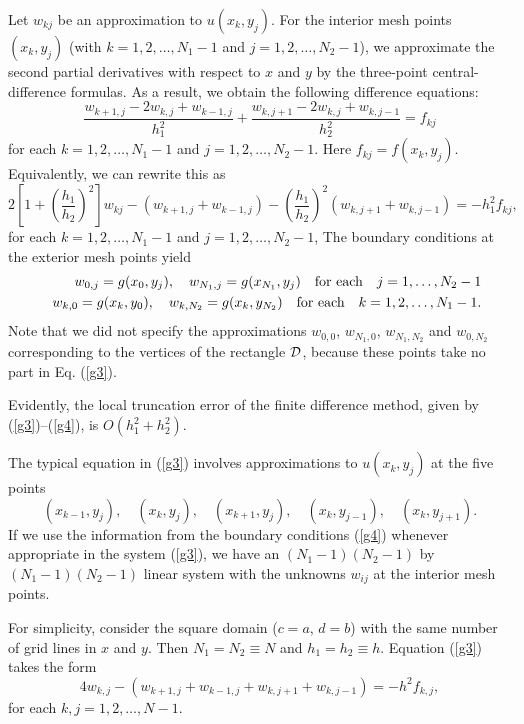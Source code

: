 Let $w_{kj}$ be an approximation to $u(x_{k}, y_{j})$.
For the interior mesh points $(x_{k}, y_{j})$ (with
$k=1,2,\dots,N_{1}-1$ and $j=1,2,\dots,N_{2}-1$), we approximate
the second partial derivatives with respect to $x$ and $y$
by the three-point central-difference formulas. As a result, we obtain the following
difference equations:
\[
\frac{w_{k+1,j}-2w_{k,j}+w_{k-1,j}}{h_{1}^{2}}+
\frac{w_{k,j+1}-2w_{k,j}+w_{k,j-1}}{h_{2}^{2}}=f_{kj}
\]
for each $k=1,2,\dots,N_{1}-1$ and $j=1,2,\dots,N_{2}-1$.
Here $f_{kj}=f(x_{k}, y_{j})$. Equivalently, we can rewrite
this as
\begin{equation}
2\left[1+\left(\frac{h_{1}}{h_{2}}\right)^{2}\right]w_{kj}-\left(w_{k+1,j}+w_{k-1,j}\right)
-\left(\frac{h_{1}}{h_{2}}\right)^{2}\left(w_{k,j+1}+w_{k,j-1}\right)
=-h_{1}^{2}f_{kj}, \label{g3}
\end{equation}
for each $k=1,2,\dots,N_{1}-1$ and $j=1,2,\dots,N_{2}-1$,
The boundary conditions at the
exterior mesh points yield
\begin{eqnarray}
&&w_{0,j}=g(x_{0}, y_{j}), \quad w_{N_{1},j}=g(x_{N_{1}}, y_{j})
\quad \hbox{for each} \quad j=1,\dots,N_{2}-1 \label{g4} \\
&&w_{k,0}=g(x_{k}, y_{0}), \quad w_{k,N_{2}}=g(x_{k}, y_{N_{2}})
\quad \hbox{for each} \quad k=1,2,\dots,N_{1}-1.\nonumber  
\end{eqnarray}
Note that we did not specify the approximations $w_{0,0}$,
$w_{N_{1},0}$, $w_{N_{1},N_{2}}$ and $w_{0,N_{2}}$ corresponding to
the vertices of the rectangle ${\cal D}$, because these points take
no part in Eq. (\ref{g3}).

 
Evidently, the local truncation
error of the finite difference method, given by (\ref{g3})--(\ref{g4}), is $O(h_{1}^{2}+h_{2}^{2})$.

 
The typical equation in (\ref{g3}) involves approximations to $u(x_{k}, y_{j})$ at the five
points
\[
(x_{k-1}, y_{j}), \quad (x_{k}, y_{j}), \quad (x_{k+1}, y_{j}), \quad
(x_{k}, y_{j-1}), \quad (x_{k}, y_{j+1}).
\]
If we use the information from the boundary conditions (\ref{g4})
whenever appropriate in the system (\ref{g3}), we have an
$(N_{1}-1)(N_{2}-1)$ by $(N_{1}-1)(N_{2}-1)$ linear system with
the unknowns $w_{ij}$ at the interior mesh points.

 
For simplicity, consider the square domain ($c=a$, $d=b$) with the same number of grid lines
in $x$ and $y$. Then $N_{1}=N_{2}\equiv N$ and $h_{1}=h_{2}\equiv h$. Equation (\ref{g3})
takes the form
\begin{equation}
4w_{k,j}-\left(w_{k+1,j}+w_{k-1,j}+w_{k,j+1}+w_{k,j-1}\right)
=-h^{2}f_{k,j}, \label{g5}
\end{equation}
for each $k,j=1,2,\dots,N-1$.

